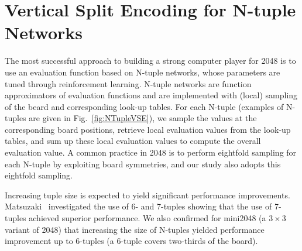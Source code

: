 \section{Vertical Split Encoding for N-tuple Networks}

The most successful approach to building a strong computer player for 2048 is to use an evaluation function based on N-tuple networks, whose parameters are tuned through reinforcement learning.
N-tuple networks are function approximators of evaluation functions and are implemented with (local) sampling of the beard and corresponding look-up tables.
For each N-tuple (examples of N-tuples are given in Fig.~\ref{fig:NTupleVSE}), we sample the values at the corresponding board positions, retrieve local evaluation values from the look-up tables, and sum up these local evaluation values to compute the overall evaluation value.
A common practice in 2048 is to perform eightfold sampling for each N-tuple by exploiting board symmetries, and our study also adopts this eightfold sampling.

Increasing tuple size is expected to yield significant performance improvements.
Matsuzaki~\cite{Mats16} investigated the use of 6- and 7-tuples showing that the use of 7-tuples achieved superior performance. We also confirmed for mini2048 (a $3\times 3$ variant of 2048) that increasing the size of N-tuples yielded performance improvement up to 6-tuples (a 6-tuple covers two-thirds of the board).

